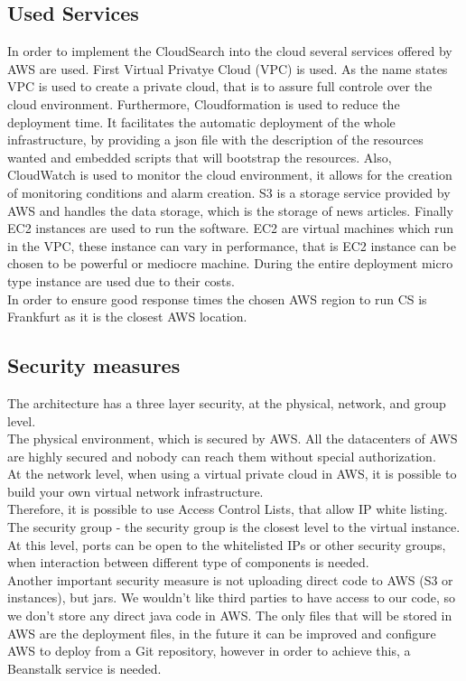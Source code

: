 \documentclass{acm_proc_article-sp}
\begin{document}
\subsection{Used Services}
In order to implement the CloudSearch into the cloud several services offered by AWS are used.
First Virtual Privatye Cloud (VPC) is used. 
As the name states VPC is used to create a private cloud, that is to assure full controle over the cloud environment.
Furthermore, Cloudformation is used to reduce the deployment time. 
It facilitates the automatic deployment of the whole infrastructure, by providing a json file with the description of the resources wanted and embedded scripts that will bootstrap the resources.
Also, CloudWatch is used to monitor the cloud environment, it allows for the creation of monitoring conditions and alarm creation.
S3 is a storage service provided by AWS and handles the data storage, which is the storage of news articles.
Finally EC2 instances are used to run the software. 
EC2 are virtual machines which run in the VPC, these instance can vary in performance, that is EC2 instance can be chosen to be powerful or mediocre machine.
During the entire deployment micro type instance are used due to their costs.\\
In order to ensure good response times the chosen AWS region to run CS is Frankfurt as it is the closest AWS location.

\subsection{Security measures}
The architecture has a three layer security, at the physical, network, and group level.\\
The physical environment, which is secured by AWS. 
All the datacenters of AWS are highly secured and nobody can reach them without special authorization.\\
At the network level, when using a virtual private cloud in AWS, it is possible to build your own virtual network infrastructure. \\
Therefore, it is possible to use Access Control Lists, that allow IP white listing.\\
The security group - the security group is the closest level to the virtual instance. 
At this level, ports can be open to the whitelisted IPs or other security groups, when interaction between different type of components is needed.\\
Another important security measure is not uploading direct code to AWS (S3 or instances), but jars. 
We wouldn't like third parties to have access to our code, so we don't store any direct java code in AWS. 
The only files that will be stored in AWS are the deployment files, in the future it can be improved and configure AWS to deploy from a Git repository, however in order to achieve this, a Beanstalk service is needed.
\end{document}
